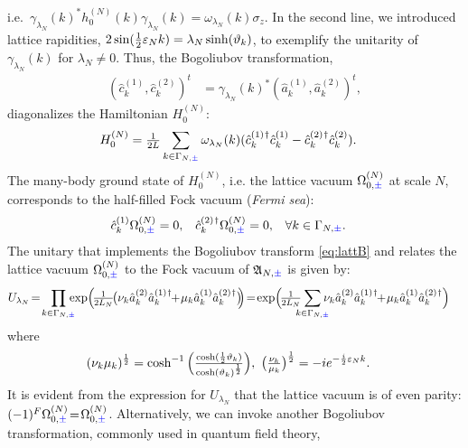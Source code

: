 \documentclass[a4paper, 11pt]{article}
\newcommand{\fA}{\mathfrak{A}}\newcommand{\cA}{\mathcal{A}}\newcommand{\dA}{\mathds{A}}\newcommand{\sA}{\mathscr{A}}
\DeclareMathOperator{\1}{\mathds{1}}
\begin{document}
i.e.~$\gamma_{\lambda_{N}}(k)^{*}h^{(N)}_{0}(k)\gamma_{\lambda_{N}}(k) = \omega_{\lambda_{N}}(k)\sigma_{z}$. In the second line, we introduced lattice rapidities, $2\sin(\tfrac{1}{2}\varepsilon_{N}k)=\lambda_{N}\sinh(\vartheta_{k})$, to exemplify the unitarity of $\gamma_{\lambda_{N}}(k)$ for $\lambda_{N}\neq0$. Thus, the Bogoliubov transformation,
\begin{align}
\label{eq:lattB}
(\hat{c}^{(1)}_{k}, \hat{c}^{(2)}_{k})^{t} & = \gamma_{\lambda_{N}}(k)^{*}(\hat{a}^{(1)}_{k}, \hat{a}^{(2)}_{k})^{t},
\end{align}
diagonalizes the Hamiltonian $H^{(N)}_{0}$:
\begin{align}
\label{eq:diagH}
H^{(N)}_{0} & = \tfrac{1}{2L}\sum_{k\in\Gamma_{N,{\color{blue}\pm}}}\omega_{\lambda_{N}}(k)(\hat{c}^{(1)\!\!\ \dagger}_{k}\hat{c}^{(1)}_{k}-\hat{c}^{(2)\!\!\ \dagger}_{k}\hat{c}^{(2)}_{k}).
\end{align}
The many-body ground state of $H^{(N)}_{0}$, i.e. the lattice vacuum $\Omega^{(N)}_{0,{\color{blue}\pm}}$ at scale $N$, corresponds to the half-filled Fock vacuum (\textit{Fermi sea}):
\begin{align}
\label{eq:Fsea}
\hat{c}^{(1)}_{k}\Omega^{(N)}_{0,{\color{blue}\pm}} & = 0, & \hat{c}^{(2)\!\!\ \dagger}_{k}\Omega^{(N)}_{0,{\color{blue}\pm}} & = 0, & \forall k&\in\Gamma_{N,{\color{blue}\pm}}.
\end{align}
The unitary that implements the Bogoliubov transform \eqref{eq:lattB} and relates the lattice vacuum $\Omega^{(N)}_{0,{\color{blue}\pm}}$ to the Fock vacuum of $\fA_{N,{\color{blue}\pm}}$ is given by:
\begin{align}
\label{eq:lattBimp}
U_{\lambda_{N}}	& \!=\!\prod_{k\in\Gamma_{N,{\color{blue}\pm}}}\!\!\!\!\exp\!\Big(\!\tfrac{1}{2L_{N}}\!\big(\nu_{k}\hat{a}^{(2)}_{k}\hat{a} ^{(1)\!\!\ \dag}_{k}\!\!+\!\mu_{k}\hat{a}^{(1)}_{k}\hat{a}^{(2)\!\!\ \dag}_{k}\big)\!\!\Big)\!=\!\exp\!\Big(\!\tfrac{1}{2L_{N}}\!\!\!\!\sum_{k\in\Gamma_{N,{\color{blue}\pm}}}\!\!\!\!\nu_{k}\hat{a}^{(2)}_{k}\hat{a}^{(1)\!\!\ \dag}_{k}\!\!+\!\mu_{k}\hat{a}^{(1)}_{k}\hat{a}^{(2)\!\!\ \dag}_{k}\Big)
\end{align}
where
\begin{align}
\label{eq:lattBpar}
(\nu_{k}\mu_{k})^{\frac{1}{2}} & = \cosh^{-1} \Big(\tfrac{\cosh(\frac{1}{2}\vartheta_{k})}{\cosh(\vartheta_{k})^{\frac{1}{2}}}\Big),\ \big(\tfrac{\nu_{k}}{\mu_{k}}\big)^{\frac{1}{2}} = -ie^{-\frac{i}{2}\vep_{N}k}.
\end{align}
It is evident from the expression for $U_{\lambda_{N}}$ that the lattice vacuum is of even parity: $(-1)^{F}\Omega^{(N)}_{0,{\color{blue}\pm}}\!=\!\Omega^{(N)}_{0,{\color{blue}\pm}}$. Alternatively, we can invoke another Bogoliubov transformation, commonly used in quantum field theory,
\end{document}
